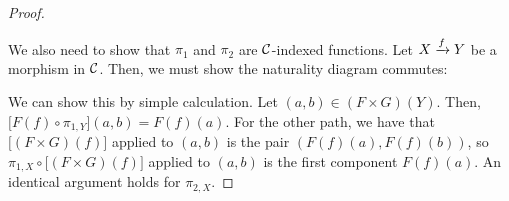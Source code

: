 \begin{proof}
\begin{itemize}
\begin{fullwidth}
  \end{fullwidth}
\end{itemize}

We also need to show that $\pi_1$ and $\pi_2$ are $\mathcal C$-indexed functions.
Let $X \xrightarrow{f} Y$ be a morphism in $\mathcal C$. Then, we must show the naturality
diagram commutes:

\begin{center}
\end{center}

We can show this by simple calculation.
Let $(a,b) \in (F \times G)(Y)$. Then, $\big[F(f) \circ \pi_{1,Y}\big](a,b)  = F(f)(a)$.
For the other path, we have that $\big[(F \times G)(f) \big]$ applied to $(a, b)$ is the pair $(F(f)(a), F(f)(b))$,
so $\pi_{1,X} \circ \big[(F \times G)(f) \big]$ applied to $(a, b)$ is the first component $F(f)(a)$.
An identical argument holds for $\pi_{2,X}$.


\end{proof}
